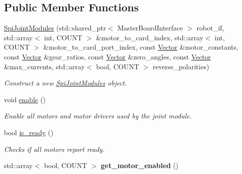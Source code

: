\subsection*{Public Member Functions}
\begin{DoxyCompactItemize}
\item 
\hyperlink{classblmc__robots_1_1SpiJointModules_afae5860967bce60813f72ae905b81d13}{Spi\+Joint\+Modules} (std\+::shared\+\_\+ptr$<$ Master\+Board\+Interface $>$ robot\+\_\+if, std\+::array$<$ int, C\+O\+U\+NT $>$ \&motor\+\_\+to\+\_\+card\+\_\+index, std\+::array$<$ int, C\+O\+U\+NT $>$ \&motor\+\_\+to\+\_\+card\+\_\+port\+\_\+index, const \hyperlink{classblmc__robots_1_1SpiJointModules_a2d48f81ec41a42a240e80cd22d4fa2f8}{Vector} \&motor\+\_\+constants, const \hyperlink{classblmc__robots_1_1SpiJointModules_a2d48f81ec41a42a240e80cd22d4fa2f8}{Vector} \&gear\+\_\+ratios, const \hyperlink{classblmc__robots_1_1SpiJointModules_a2d48f81ec41a42a240e80cd22d4fa2f8}{Vector} \&zero\+\_\+angles, const \hyperlink{classblmc__robots_1_1SpiJointModules_a2d48f81ec41a42a240e80cd22d4fa2f8}{Vector} \&max\+\_\+currents, std\+::array$<$ bool, C\+O\+U\+NT $>$ reverse\+\_\+polarities)\hypertarget{classblmc__robots_1_1SpiJointModules_afae5860967bce60813f72ae905b81d13}{}\label{classblmc__robots_1_1SpiJointModules_afae5860967bce60813f72ae905b81d13}

\begin{DoxyCompactList}\small\item\em Construct a new \hyperlink{classblmc__robots_1_1SpiJointModules}{Spi\+Joint\+Modules} object. \end{DoxyCompactList}\item 
void \hyperlink{classblmc__robots_1_1SpiJointModules_a427be7b88b487059317425fa2d725d56}{enable} ()\hypertarget{classblmc__robots_1_1SpiJointModules_a427be7b88b487059317425fa2d725d56}{}\label{classblmc__robots_1_1SpiJointModules_a427be7b88b487059317425fa2d725d56}

\begin{DoxyCompactList}\small\item\em Enable all motors and motor drivers used by the joint module. \end{DoxyCompactList}\item 
bool \hyperlink{classblmc__robots_1_1SpiJointModules_a100d408ad8452cddde9c053cc33e8b3b}{is\+\_\+ready} ()
\begin{DoxyCompactList}\small\item\em Checks if all motors report ready. \end{DoxyCompactList}\item 
std\+::array$<$ bool, C\+O\+U\+NT $>$ {\bfseries get\+\_\+motor\+\_\+enabled} ()\hypertarget{classblmc__robots_1_1SpiJointModules_aed433d32a92fb49a0597d06121f39695}{}\label{classblmc__robots_1_1SpiJointModules_aed433d32a92fb49a0597d06121f39695}


\end{DoxyCompactItemize}
